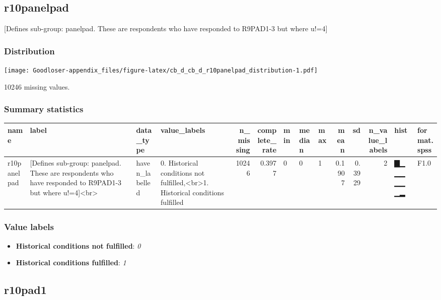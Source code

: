 \documentclass[
]{book}
\providecommand{\tightlist}{%
  \setlength{\itemsep}{0pt}\setlength{\parskip}{0pt}}
\begin{document}
\hypertarget{r10panelpad}{%
\subsection{r10panelpad}\label{r10panelpad}}

{[}Defines sub-group: panelpad. These are respondents who have responded to R9PAD1-3 but where u!=4{]}

\hypertarget{r10panelpad_distribution}{%
\subsubsection{Distribution}\label{r10panelpad_distribution}}

\texttt{[image: Goodloser-appendix\_files/figure-latex/cb\_d\_cb\_d\_r10panelpad\_distribution-1.pdf]}

10246 missing values.

\hypertarget{r10panelpad_summary}{%
\subsubsection{Summary statistics}\label{r10panelpad_summary}}

\begin{tabular}{l|l|l|l|r|r|l|l|l|r|r|r|l|l}
\hline
name & label & data_type & value_labels & n_missing & complete_rate & min & median & max & mean & sd & n_value_labels & hist & format.spss\\
\hline
r10panelpad & [Defines sub-group: panelpad. These are respondents who have responded to R9PAD1-3 but where u!=4]<br> & haven_labelled & 0. Historical conditions not fulfilled,<br>1. Historical conditions fulfilled & 10246 & 0.3977 & 0 & 0 & 1 & 0.1907 & 0.3929 & 2 & ▇▁▁▁▁▁▁▂ & F1.0\\
\hline
\end{tabular}

\hypertarget{r10panelpad_labels}{%
\subsubsection{Value labels}\label{r10panelpad_labels}}

\begin{itemize}
\tightlist
\item
  \textbf{Historical conditions not fulfilled}: \emph{0}
\item
  \textbf{Historical conditions fulfilled}: \emph{1}
\end{itemize}

\hypertarget{r10pad1}{%
\subsection{r10pad1}\label{r10pad1}}
\end{document}

